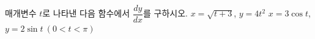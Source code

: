 매개변수 $t$로 나타낸 다음 함수에서 $\dfrac{dy}{dx}$를 구하시오.
 $x=\sqrt{t+3}$, $y=4t^2$
 $x=3\cos t$, $y=2\sin t\ (0<t<\pi)$
